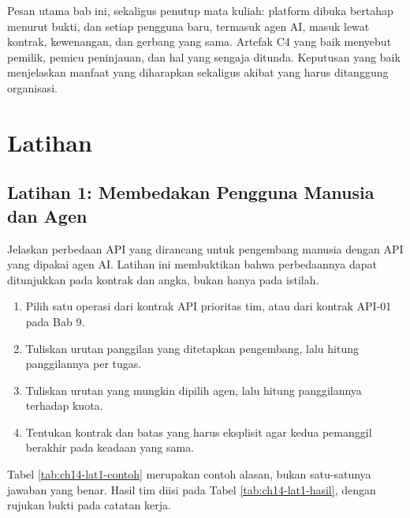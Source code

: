Pesan utama bab ini, sekaligus penutup mata kuliah: platform dibuka bertahap menurut bukti, dan setiap pengguna baru, termasuk agen AI, masuk lewat kontrak, kewenangan, dan gerbang yang sama. Artefak C4 yang baik menyebut pemilik, pemicu peninjauan, dan hal yang sengaja ditunda. Keputusan yang baik menjelaskan manfaat yang diharapkan sekaligus akibat yang harus ditanggung organisasi.

\section{Latihan}

\subsection*{Latihan 1: Membedakan Pengguna Manusia dan Agen}

Jelaskan perbedaan API yang dirancang untuk pengembang manusia dengan API yang dipakai agen AI. Latihan ini membuktikan bahwa perbedaannya dapat ditunjukkan pada kontrak dan angka, bukan hanya pada istilah.

\begin{enumerate}
  \item Pilih satu operasi dari kontrak API prioritas tim, atau dari kontrak API-01 pada Bab 9.
  \item Tuliskan urutan panggilan yang ditetapkan pengembang, lalu hitung panggilannya per tugas.
  \item Tuliskan urutan yang mungkin dipilih agen, lalu hitung panggilannya terhadap kuota.
  \item Tentukan kontrak dan batas yang harus eksplisit agar kedua pemanggil berakhir pada keadaan yang sama.
\end{enumerate}

Tabel \ref{tab:ch14-lat1-contoh} merupakan contoh alasan, bukan satu-satunya jawaban yang benar. Hasil tim diisi pada Tabel \ref{tab:ch14-lat1-hasil}, dengan rujukan bukti pada catatan kerja.

